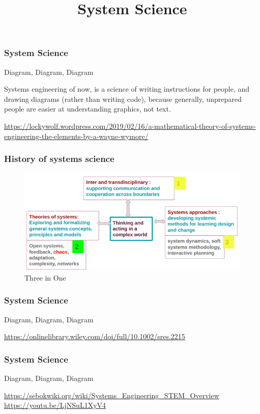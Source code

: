\title[Systems Engineering]{ System Science} 

\newpage
\begin{frame}
\frametitle{ System Science }
\begin{block}{Diagram, Diagram, Diagram}

Systems engineering of now, is a science of writing instructions for people, and drawing diagrams (rather than writing code), because generally, unprepared people are easier at understanding graphics, not text.

\url{https://lockywolf.wordpress.com/2019/02/16/a-mathematical-theory-of-systems-engineering-the-elements-by-a-wayne-wymore/}

\end{block}
\end{frame}



\begin{frame}
\frametitle{ History of systems science }
\begin{figure}
\includegraphics[scale=0.46]{pic/sysview.png}
\caption{  Three  in One }
\label{Layer1a}
\end{figure}
\end{frame}


\newpage
\begin{frame}
\frametitle{ System Science }
\begin{block}{Diagram, Diagram, Diagram}

 \url{https://onlinelibrary.wiley.com/doi/full/10.1002/sres.2215}


\end{block}
\end{frame}



\newpage
\begin{frame}
\frametitle{ System Science }
\begin{block}{Diagram, Diagram, Diagram}

\url{https://sebokwiki.org/wiki/Systems_Engineering_STEM_Overview}
\url{https://youtu.be/LjNSuL1XyV4}

\end{block}
\end{frame}


